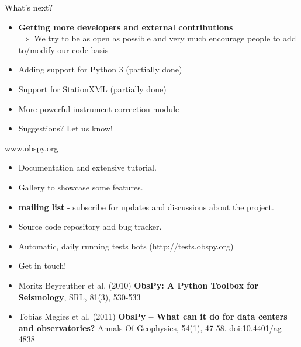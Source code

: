\documentclass[handout]{beamer}
\begin{document}
\begin{frame}[plain]{What's next?}
    \begin{itemize}
            \item \textbf{Getting more developers and external contributions} \\ $\Rightarrow$ We try to be as open as possible and very much encourage people to add to/modify our code basis
            \item Adding support for Python 3 (partially done)
            \item Support for StationXML (partially done)
            \item More powerful instrument correction module
            \item Suggestions? Let us know!
    \end{itemize}
\end{frame}


\begin{frame}[plain]{www.obspy.org}
    \begin{itemize}
        \item Documentation and extensive tutorial.
        \item Gallery to showcase some features.
        \item \textbf{mailing list} - subscribe for updates and discussions about the project.
        \item Source code repository and bug tracker.
        \item Automatic, daily running tests bots (http://tests.obspy.org)
        \item Get in touch!
    \end{itemize}

    \vspace{2em}

    \small
    \begin{itemize}
        \item Moritz Beyreuther et al. (2010) \textbf{ObsPy: A Python Toolbox for Seismology}, SRL, 81(3), 530-533
        \item Tobias Megies et al. (2011) \textbf{ObsPy – What can it do for data centers and observatories?} Annals Of Geophysics, 54(1), 47-58. doi:10.4401/ag-4838
    \end{itemize}
\end{frame}
\end{document}
